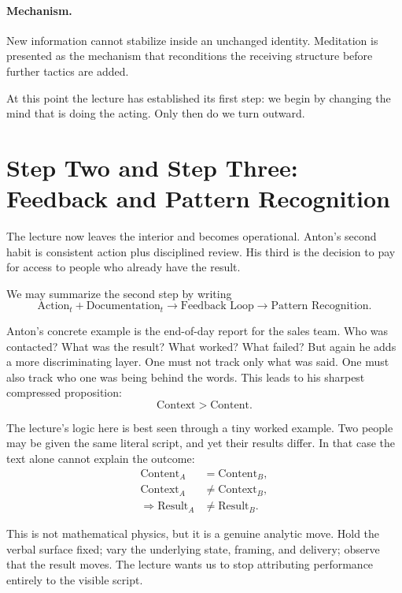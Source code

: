 \paragraph{Mechanism.}
New information cannot stabilize inside an unchanged identity. Meditation is presented as the mechanism that reconditions the receiving structure before further tactics are added.

At this point the lecture has established its first step: we begin by changing the mind that is doing the acting. Only then do we turn outward.

\section{Step Two and Step Three: Feedback and Pattern Recognition}

The lecture now leaves the interior and becomes operational. Anton's second habit is consistent action plus disciplined review. His third is the decision to pay for access to people who already have the result.

We may summarize the second step by writing
\begin{equation}
\text{Action}_t + \text{Documentation}_t \to \text{Feedback Loop} \to \text{Pattern Recognition}.
\end{equation}

Anton's concrete example is the end-of-day report for the sales team. Who was contacted? What was the result? What worked? What failed? But again he adds a more discriminating layer. One must not track only what was said. One must also track who one was being behind the words. This leads to his sharpest compressed proposition:
\begin{equation}
\text{Context} > \text{Content}.
\end{equation}

The lecture's logic here is best seen through a tiny worked example. Two people may be given the same literal script, and yet their results differ. In that case the text alone cannot explain the outcome:
\begin{align}
\text{Content}_A &= \text{Content}_B,\\
\text{Context}_A &\neq \text{Context}_B,\\
\Rightarrow \text{Result}_A &\neq \text{Result}_B.
\end{align}

This is not mathematical physics, but it is a genuine analytic move. Hold the verbal surface fixed; vary the underlying state, framing, and delivery; observe that the result moves. The lecture wants us to stop attributing performance entirely to the visible script.

